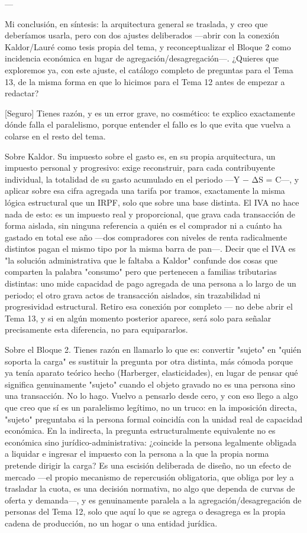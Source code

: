 \documentclass[10pt,a4paper]{article}
\begin{document}
---

Mi conclusión, en síntesis: la arquitectura general se traslada, y creo que deberíamos usarla, pero con dos ajustes deliberados —abrir con la conexión Kaldor/Lauré como tesis propia del tema, y reconceptualizar el Bloque 2 como incidencia económica en lugar de agregación/desagregación—. ¿Quieres que exploremos ya, con este ajuste, el catálogo completo de preguntas para el Tema 13, de la misma forma en que lo hicimos para el Tema 12 antes de empezar a redactar?

[Seguro] Tienes razón, y es un error grave, no cosmético: te explico exactamente dónde falla el paralelismo, porque entender el fallo es lo que evita que vuelva a colarse en el resto del tema.

Sobre Kaldor. Su impuesto sobre el gasto es, en su propia arquitectura, un impuesto personal y progresivo: exige reconstruir, para cada contribuyente individual, la totalidad de su gasto acumulado en el periodo —Y − ΔS = C—, y aplicar sobre esa cifra agregada una tarifa por tramos, exactamente la misma lógica estructural que un IRPF, solo que sobre una base distinta. El IVA no hace nada de esto: es un impuesto real y proporcional, que grava cada transacción de forma aislada, sin ninguna referencia a quién es el comprador ni a cuánto ha gastado en total ese año —dos compradores con niveles de renta radicalmente distintos pagan el mismo tipo por la misma barra de pan—. Decir que el IVA es "la solución administrativa que le faltaba a Kaldor" confunde dos cosas que comparten la palabra "consumo" pero que pertenecen a familias tributarias distintas: uno mide capacidad de pago agregada de una persona a lo largo de un periodo; el otro grava actos de transacción aislados, sin trazabilidad ni progresividad estructural. Retiro esa conexión por completo — no debe abrir el Tema 13, y si en algún momento posterior aparece, será solo para señalar precisamente esta diferencia, no para equipararlos.

Sobre el Bloque 2. Tienes razón en llamarlo lo que es: convertir "sujeto" en "quién soporta la carga" es sustituir la pregunta por otra distinta, más cómoda porque ya tenía aparato teórico hecho (Harberger, elasticidades), en lugar de pensar qué significa genuinamente "sujeto" cuando el objeto gravado no es una persona sino una transacción. No lo hago. Vuelvo a pensarlo desde cero, y con eso llego a algo que creo que sí es un paralelismo legítimo, no un truco: en la imposición directa, "sujeto" preguntaba si la persona formal coincidía con la unidad real de capacidad económica. En la indirecta, la pregunta estructuralmente equivalente no es económica sino jurídico-administrativa: ¿coincide la persona legalmente obligada a liquidar e ingresar el impuesto con la persona a la que la propia norma pretende dirigir la carga? Es una escisión deliberada de diseño, no un efecto de mercado —el propio mecanismo de repercusión obligatoria, que obliga por ley a trasladar la cuota, es una decisión normativa, no algo que dependa de curvas de oferta y demanda—, y es genuinamente paralela a la agregación/desagregación de personas del Tema 12, solo que aquí lo que se agrega o desagrega es la propia cadena de producción, no un hogar o una entidad jurídica.
\end{document}
